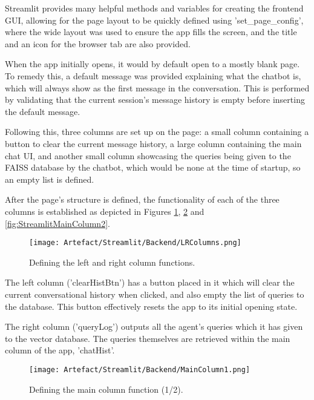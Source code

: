 \noindent Streamlit provides many helpful methods and variables for creating the frontend GUI, allowing for the page layout to be 
quickly defined using 'set\_page\_config', where the wide layout was used to ensure the app fills the screen, and the title and an icon 
for the browser tab are also provided. 

\para When the app initially opens, it would by default open to a mostly blank page. To remedy this, a default message was provided 
explaining what the chatbot is, which will always show as the first message in the conversation. This is performed by validating that 
the current session's message history is empty before inserting the default message.

\para Following this, three columns are set up on the page: a small column containing a button to clear the current message history,
a large column containing the main chat UI, and another small column showcasing the queries being given to the FAISS database by the 
chatbot, which would be none at the time of startup, so an empty list is defined.

\para After the page's structure is defined, the functionality of each of the three columns is established as depicted in Figures \ref{fig:StreamlitLRColumns}, \ref{fig:StreamlitMainColumn1} and \ref{fig:StreamlitMainColumn2}.

\begin{figure}[H]
    \centering
    \texttt{[image: Artefact/Streamlit/Backend/LRColumns.png]}
    \caption{Defining the left and right column functions. \label{fig:StreamlitLRColumns}}
\end{figure}

\noindent The left column ('clearHistBtn') has a button placed in it which will clear the current conversational history when clicked,
and also empty the list of queries to the database. This button effectively resets the app to its initial opening state.

\para The right column ('queryLog') outputs all the agent's queries which it has given to the vector database. The queries themselves are 
retrieved within the main column of the app, 'chatHist'.

\begin{figure}[H]
    \centering
    \texttt{[image: Artefact/Streamlit/Backend/MainColumn1.png]}
    \caption{Defining the main column function (1/2). \label{fig:StreamlitMainColumn1}}
\end{figure}

